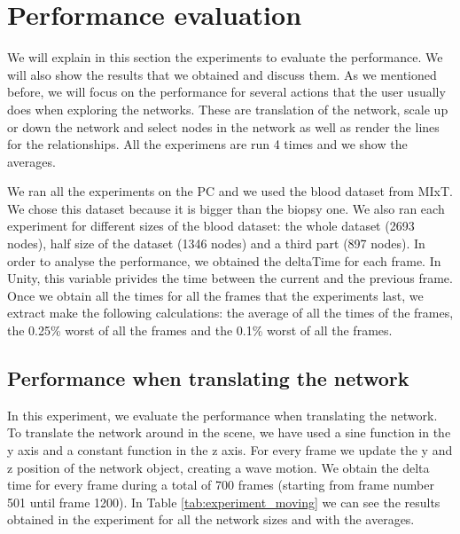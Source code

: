 \section{Performance evaluation}
We will explain in this section the experiments to evaluate the performance. We will also show the results that we obtained and discuss them. As we mentioned before, we will focus on the performance for several actions that the user usually does when exploring the networks. These are translation of the network, scale up or down the network and select nodes in the network as well as render the lines for the relationships. All the experimens are run 4 times and we show the averages.

We ran all the experiments on the PC and we used the blood dataset from MIxT. We chose this dataset because it is bigger than the biopsy one. We also ran each experiment for different sizes of the blood dataset: the whole dataset (2693 nodes), half size of the dataset (1346 nodes) and a third part (897 nodes). In order to analyse the performance, we obtained the deltaTime for each frame. In Unity, this variable privides the time between the current and the previous frame. Once we obtain all the times for all the frames that the experiments last, we extract make the following calculations: the average of all the times of the frames, the 0.25\% worst of all the frames and the 0.1\% worst of all the frames.


\subsection{Performance when translating the network}
In this experiment, we evaluate the performance when translating the network. To translate the network around in the scene, we have used a sine function in the y axis and a constant function in the z axis. For every frame we update the y and z position of the network object, creating a wave motion. We obtain the delta time for every frame during a total of 700 frames (starting from frame number 501 until frame 1200). In Table \ref{tab:experiment_moving} we can see the results obtained in the experiment for all the network sizes and with the averages.

